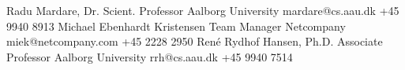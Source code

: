 %
%
%


\begin{referees}
		{Radu Mardare, Dr. Scient.}
		{Professor}
		{Aalborg University}
		{mardare@cs.aau.dk}
		{+45 9940 8913}
		{Michael Ebenhardt Kristensen}
		{Team Manager}
		{Netcompany}
		{miek@netcompany.com}
		{+45 2228 2950}
		{René Rydhof Hansen, Ph.D.}
		{Associate Professor}
		{Aalborg University}
		{rrh@cs.aau.dk}
		{+45 9940 7514}
\end{referees}